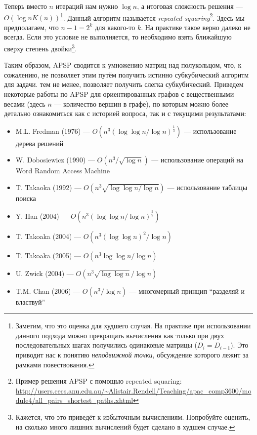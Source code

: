 Теперь вместо $n$ итераций нам нужно $\log{n}$, а итоговая сложность решения --- $O(\log{n} K(n))$\footnote{Заметим, что это оценка для худшего случая. На практике при использовании данного подхода можно прекращать вычисления как только при двух последовательных шагах получились одинаковые матрицы ($D_i = D_{i-1}$). Это приводит нас к понятию \textit{неподвижной точки}, обсуждение которого лежит за рамками повествования.}.
Данный алгоритм называется \textit{repeated squaring}\footnote{Пример решения APSP с помощью repeated squaring: \url{http://users.cecs.anu.edu.au/~Alistair.Rendell/Teaching/apac_comp3600/module4/all_pairs_shortest_paths.xhtml}}. Здесь мы предполагаем, что $n-1 = 2^k$ для какого-то $k$. На практике такое верно далеко не всегда. Если это условие не выполняется, то необходимо взять ближайшую сверху степень двойки\footnote{Кажется, что это приведёт к избыточным вычислениям. Попробуйте оценить, на сколько много лишних вычислений будет сделано в худшем случае.}.

Таким образом, APSP сводится к умножению матриц над полукольцом, что, к сожалению, не позволяет этим путём получить истинно субкубический алгоритм для задачи. тем не менее, позволяет получить слегка субкубический. Приведем некоторые работы по APSP для ориентированных графов с вещественными весами (здесь $n$ --- количество вершин в графе), по которым можно более детально ознакомиться как с историей вопроса, так и с текущими результатами:
\begin{itemize}
    \item M.L. Fredman (1976) --- $O(n^3(\log \log n / \log n)^\frac{1}{3})$ --- использование дерева решений~\cite{FredmanAPSP1976}
    \item W. Dobosiewicz (1990) --- $O(n^3 / \sqrt{\log n})$ --- использование операций на Word Random Access Machine~\cite{Dobosiewicz1990}
    \item T. Takaoka (1992) --- $O(n^3 \sqrt{\log \log n / \log n})$ --- использование таблицы поиска~\cite{Takaoka1992}
    \item Y. Han (2004) --- $O(n^3 (\log \log n / \log n)^\frac{5}{7})$~\cite{Han2004}
    \item T. Takoaka (2004) --- $O(n^3 (\log \log n)^2 / \log n)$~\cite{Takaoka2004}
    \item T. Takoaka (2005) --- $O(n^3 \log \log n / \log n)$~\cite{Takaoka2005}
    \item U. Zwick (2004) --- $O(n^3 \sqrt{\log \log n} / \log n)$~\cite{Zwick2004}
    \item T.M. Chan (2006) --- $O(n^3 / \log n)$ --- многомерный принцип ``разделяй и властвуй''~\cite{Chan2008}
\end{itemize}

